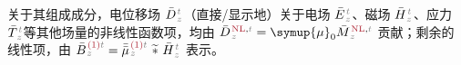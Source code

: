 关于其组成成分，电位移场 $\bar{D}^{\;\!\mathcolor{gray}{t}}_{\;\!\mathcolor{gray}{z}}$（直接/显示地）关于电场 $\bar{E}^{\;\!\mathcolor{gray}{t}}_{\;\!\mathcolor{gray}{z}}$、磁场 $\bar{H}^{\;\!\mathcolor{gray}{t}}_{\;\!\mathcolor{gray}{z}}$、应力 $\bar{T}^{\;\!\mathcolor{gray}{t}}_{\;\!\mathcolor{gray}{z}}$等其他场量的非线性函数项，均由 $\bar{D}^{\;\!\textcolor{Maroon}{\text{NL}}, \mathcolor{gray}{t}}_{\;\!\mathcolor{gray}{z}} = {\symup{\mu}}_0 \bar{M}^{\;\!\textcolor{Maroon}{\text{NL}}, \mathcolor{gray}{t}}_{\;\!\mathcolor{gray}{z}}$ 贡献；剩余的线性项，由 $\bar{B}^{\;\!\textcolor{Maroon}{\text{(1)}} \mathcolor{gray}{t}}_{\;\!\mathcolor{gray}{z}} = \bar{\bar{\mu}}^{\;\!\textcolor{Maroon}{\text{(1)}} \mathcolor{gray}{t}}_{\;\!\mathcolor{gray}{z}}~\widetilde *~\bar{H}^{\;\!\mathcolor{gray}{t}}_{\;\!\mathcolor{gray}{z}}$ 表示。

